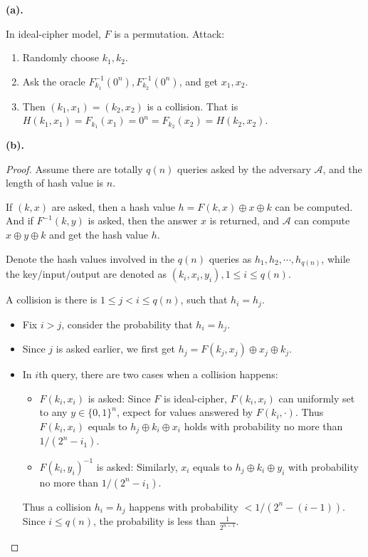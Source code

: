 \documentclass[a4paper]{article}
\newcommand{\A}{\mathcal{A}}
\newenvironment{problem}[2][Problem]{\begin{trivlist}
\item[\hskip \labelsep {\bfseries #1}\hskip \labelsep {\bfseries #2.}]}{\end{trivlist}}
\begin{document}
\begin{problem}{6.19}
\textbf{(a).}\par
In ideal-cipher model, $F$ is a permutation.
Attack:\begin{enumerate}
    \item Randomly choose $k_1,k_2$.
    \item Ask the oracle $F_{k_1}^{-1}(0^n),F_{k_2}^{-1}(0^n)$, and get $x_1,x_2$.
    \item Then $(k_1,x_1)=(k_2,x_2)$ is a collision. That is $H(k_1,x_1)=F_{k_1}(x_1)=0^n=F_{k_2}(x_2)=H(k_2,x_2)$.
\end{enumerate}
\par\vspace{3ex}

\textbf{(b).}\par
\begin{proof}
Assume there are totally $q(n)$ queries asked by the adversary $\A$, and the length of hash value is $n$.\par
If $(k,x)$ are asked, then a hash value $h=F(k,x)\oplus x\oplus k$ can be computed. And if $F^{-1}(k,y)$ is asked, then the answer $x$ is returned, and $\A$ can compute $x\oplus y\oplus k$ and get the hash value $h$. \par 
Denote the hash values involved in the $q(n)$ queries as $h_1,h_2,\cdots,h_{q(n)}$, while the key/input/output are denoted as $(k_i,x_i,y_i),1\le i\le q(n)$.\par
A collision is there is $1\le j<i\le q(n)$, such that $h_i=h_j$. 
\begin{itemize}
    \item Fix $i>j$, consider the probability that $h_i=h_j$. 
    \item Since $j$ is asked earlier, we first get $h_j=F(k_j,x_j)\oplus x_j\oplus k_j$.
    \item In $i$th query, there are two cases when a collision happens:
    \begin{itemize}
        \item $F(k_i,x_i)$ is asked: Since $F$ is ideal-cipher, $F(k_i,x_i)$ can uniformly set to any $y\in\{0,1\}^n$, expect for values answered by $F(k_i,\cdot)$. Thus $F(k_i,x_i)$ equals to $h_j\oplus k_i\oplus x_i$ holds with probability no more than $1/(2^n-i_1)$. 
        \item $F(k_i,y_i)^{-1}$ is asked: Similarly, $x_i$ equals to $h_j\oplus k_i\oplus y_i$ with probability no more than $1/(2^n-i_1)$.  
    \end{itemize}
    Thus a collision $h_i=h_j$ happens with probability $<1/(2^n-(i-1))$. Since $i\le q(n)$, the probability is less than $\frac{1}{2^{n-1}}$.

\end{itemize}
\end{proof}
\end{problem}
\end{document}
